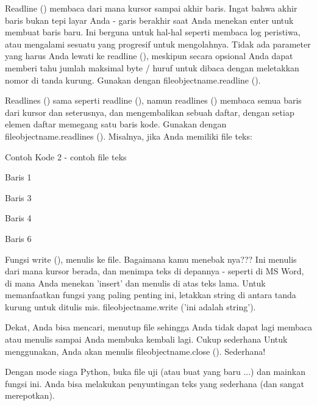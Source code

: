 \noindent 
\vspace{12pt}
\noindent 
Readline () membaca dari mana kursor sampai akhir baris. Ingat bahwa akhir baris bukan tepi layar Anda - garis berakhir saat Anda menekan enter untuk membuat baris baru. Ini berguna untuk hal-hal seperti membaca log peristiwa, atau mengalami sesuatu yang progresif untuk mengolahnya. Tidak ada parameter yang harus Anda lewati ke readline (), meskipun secara opsional Anda dapat memberi tahu jumlah maksimal byte / huruf untuk dibaca dengan meletakkan nomor di tanda kurung. Gunakan dengan fileobjectname.readline (). \par
\noindent 
\vspace{12pt}
\noindent 
Readlines () sama seperti readline (), namun readlines () membaca semua baris dari kursor dan seterusnya, dan mengembalikan sebuah daftar, dengan setiap elemen daftar memegang satu baris kode. Gunakan dengan fileobjectname.readlines (). Misalnya, jika Anda memiliki file teks: \par
\noindent 
Contoh Kode 2 - contoh file teks \par
\noindent 
\vspace{12pt}
\noindent 
Baris 1 \par
\noindent 
\vspace{12pt}
\noindent 
Baris 3 \par
\noindent 
Baris 4 \par
\noindent 
\vspace{12pt}
\noindent 
Baris 6 \par
\vspace{14pt}
\noindent 
Fungsi write (), menulis ke file. Bagaimana kamu menebak nya??? Ini menulis dari mana kursor berada, dan menimpa teks di depannya - seperti di MS Word, di mana Anda menekan 'insert' dan menulis di atas teks lama. Untuk memanfaatkan fungsi yang paling penting ini, letakkan string di antara tanda kurung untuk ditulis mis. fileobjectname.write ('ini adalah string'). \par
\noindent 
\vspace{12pt}
\noindent 
Dekat, Anda bisa mencari, menutup file sehingga Anda tidak dapat lagi membaca atau menulis sampai Anda membuka kembali lagi. Cukup sederhana Untuk menggunakan, Anda akan menulis fileobjectname.close (). Sederhana! \par
\noindent 
\vspace{12pt}
\noindent 
Dengan mode siaga Python, buka file uji (atau buat yang baru ...) dan mainkan fungsi ini. Anda bisa melakukan penyuntingan teks yang sederhana (dan sangat merepotkan). \par
